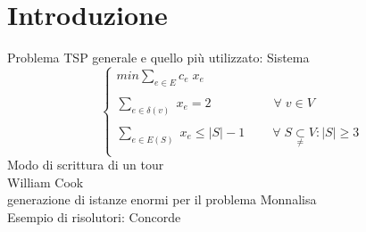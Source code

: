 \chapter{Introduzione}
Problema TSP generale e quello più utilizzato: Sistema
$$
\begin{cases}
min \underset{e\in E}\sum{c_e\;x_e} \\\\
\underset{e\in \delta(v)}\sum{\;x_e} = 2\;\;\;\;\;\;\;\;\;\;\;\;\;\;\;\;\;\;\forall\;v\in V \\\\
\underset{e\in E(S)}\sum{\;x_e} \leq \vert S\vert - 1\;\;\;\;\;\;\;\;\forall\;S\underset{\neq} \subset V: \vert S\vert\geq 3\\
\end{cases}
$$
Modo di scrittura di un tour\\
William Cook \cite{cook}\\
generazione di istanze enormi per il problema Monnalisa \cite{monnalisa}\\
Esempio di risolutori: Concorde \cite{concorde}\\
